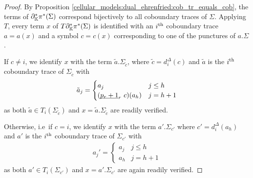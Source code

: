 \begin{proof}
    By Proposition \ref{cellular_models:dual_ehrenfried:cob_tr_equals_cob}, the terms of $\partial_\mathbb K^\ast \pi^\ast(\Sigma)$ correspond bijectively to all coboundary traces of $\Sigma$.
    Applying $T$, every term $x$ of $T\partial_\mathbb K^\ast \pi^\ast(\Sigma)$ is identified with an $i^{\text{th}}$ coboundary trace $a = a(x)$ and a symbol $c = c(x)$ corresponding to one of the punctures of $a.\Sigma$.
    
    If $c \neq i$, we identify $x$ with the term $\tilde a .\Sigma_{\tilde c}$, where $\tilde c = d_i^\Delta(c)$ and $\tilde a$ is the $i^{\text{th}}$ coboundary trace of $\Sigma_{\tilde c}$ with
    \begin{align}
        \label{homology_operations:parallel_T:T_commutes_with_del_pi:c_neq_i}
        \tilde a_j = \begin{cases} a_j & j \le h \\ (\ul{p_r+1}_r\ c)(a_h) & j = h+1 \end{cases}
    \end{align}
    as both $\tilde a \in T_i(\Sigma_{\tilde c})$ and $x = \tilde a.\Sigma_{\tilde c}$ are readily verified.
    
    Otherwise, i.e\ if $c = i$, we identify $x$ with the term $a'.\Sigma_{c'}$ where $c' = d_i^\Delta(a_h)$ and  $a'$ is the $i^{\text{th}}$ coboundary trace of $\Sigma_{c'}$ with
    \begin{align}
        \label{homology_operations:parallel_T:T_commutes_with_del_pi:c_eq_i}
        a_j' = \begin{cases} a_j & j \le h \\ a_h & j = h+1 \end{cases}
    \end{align}
    as both $a' \in T_i(\Sigma_{c'})$ and $x = a'.\Sigma_{c'}$ are again readily verified.
    

\end{proof}
